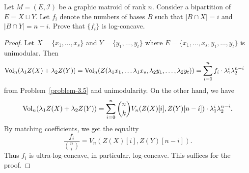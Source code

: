 \documentclass[12pt]{article}
\begin{document}
\begin{problem}
	Let $M = (E, \mathcal{I})$ be a graphic matroid of rank $n$. Consider a bipartition of $E = X \sqcup Y$. Let $f_i$ denote the numbers of bases $B$ such that $|B \cap X| = i$ and $|B \cap Y| = n-i$. Prove that $\{f_i\}$ is log-concave.
\end{problem}

\begin{proof}
	Let $X = \{x_1, \ldots, x_s\}$	and $Y = \{y_1, \ldots, y_t\}$ where $E = \{x_1, \ldots , x_s, y_1, \ldots, y_t\}$ is unimodular. Then 
 \begin{align*}
 	\operatorname{Vol}_n(\lambda_1 Z(X) + \lambda_2 Z(Y)) & = \operatorname{Vol}_n(Z(\lambda_1 x_1, \ldots \lambda_1 x_s, \lambda_2 y_1, \ldots, \lambda_2 y_t)) = \sum_{i = 0}^n f_i \cdot \lambda_1^i \lambda_2^{n-i}
 \end{align*}
 from Problem~\ref{problem-3.5} and unimodularity. On the other hand, we have 
 \[
 	\operatorname{Vol}_n(\lambda_1 Z(X) + \lambda_2 Z(Y)) = \sum_{i = 0}^n \binom{n}{k} V_n(Z(X)[i], Z(Y)[n-i]) \cdot \lambda_1^i \lambda_2^{n-i}.
 \]
 By matching coefficients, we get the equality
 \[
 	\frac{f_i}{\binom{n}{i}} = V_n(Z(X)[i], Z(Y)[n-i]).
 \]
 Thus $f_i$ is ultra-log-concave, in particular, log-concave. This suffices for the proof.
\end{proof}

\newpage 



\end{document}
